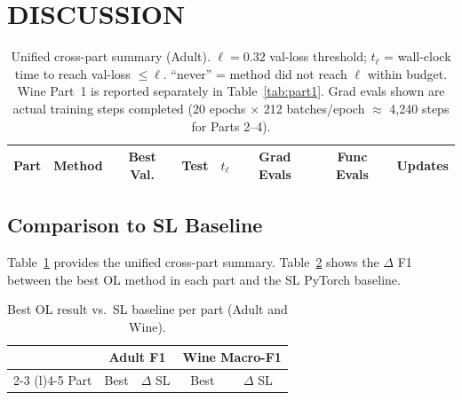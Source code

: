 \documentclass[letterpaper, 10 pt, conference]{ieeeconf}
\begin{document}
\section{DISCUSSION}

\begin{table}[!t]
    \centering
    \scriptsize
    \caption{Unified cross-part summary (Adult). $\ell = 0.32$ val-loss threshold; $t_\ell$ = wall-clock time to reach val-loss $\leq \ell$. ``never'' = method did not reach $\ell$ within budget. Wine Part~1 is reported separately in Table~\ref{tab:part1}. Grad evals shown are actual training steps completed (20 epochs $\times$ 212 batches/epoch $\approx$ 4{,}240 steps for Parts 2--4).}
    \label{tab:summary}
    \setlength{\tabcolsep}{3.5pt}
    \renewcommand{\arraystretch}{1.0}
    \begin{tabular}{@{}>{\raggedright\arraybackslash}p{1.5cm}>{\raggedright\arraybackslash}p{1.8cm}ccccc>{\raggedright\arraybackslash}p{2.8cm}@{}}
    \toprule
    Part & Method & Best Val. & Test & $t_\ell$ & Grad Evals & Func Evals & Updates \\
    \midrule
    
    \bottomrule
    \end{tabular}
    \renewcommand{\arraystretch}{1.0}
\end{table}

\subsection{Comparison to SL Baseline}

Table~\ref{tab:summary} provides the unified cross-part summary. Table~\ref{tab:sl_comparison} shows the $\Delta$ F1 between the best OL method in each part and the SL PyTorch baseline.

\begin{table}[!htbp]
    \centering
    \caption{Best OL result vs.\ SL baseline per part (Adult and Wine).}
    \label{tab:sl_comparison}
    \setlength{\tabcolsep}{3pt}
    \begin{tabular}{@{}lcccc@{}}
    \toprule
    & \multicolumn{2}{c}{\textbf{Adult F1}} & \multicolumn{2}{c}{\textbf{Wine Macro-F1}} \\
    \cmidrule(lr){2-3} \cmidrule(l){4-5}
    Part & Best & $\Delta$ SL & Best & $\Delta$ SL \\
    \midrule
    
    \bottomrule
    \end{tabular}
\end{table}
\end{document}
